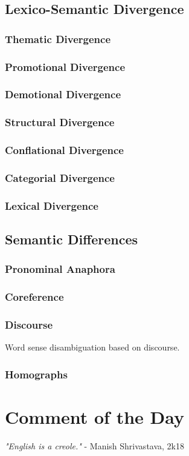 \documentclass{article}
\begin{document}

\subsection{Lexico-Semantic  Divergence}

\subsubsection{Thematic Divergence}
\subsubsection{Promotional Divergence}
\subsubsection{Demotional Divergence}
\subsubsection{Structural Divergence}
\subsubsection{Conflational Divergence}
\subsubsection{Categorial Divergence}
\subsubsection{Lexical Divergence}

\subsection{Semantic Differences}

\subsubsection{Pronominal Anaphora}
\subsubsection{Coreference}
\subsubsection{Discourse}

Word sense disambiguation based on discourse.

\subsubsection{Homographs}
\section{Comment of the Day}

\textit{"English is a creole."} - Manish Shrivastava, 2k18
  
\end{document}
